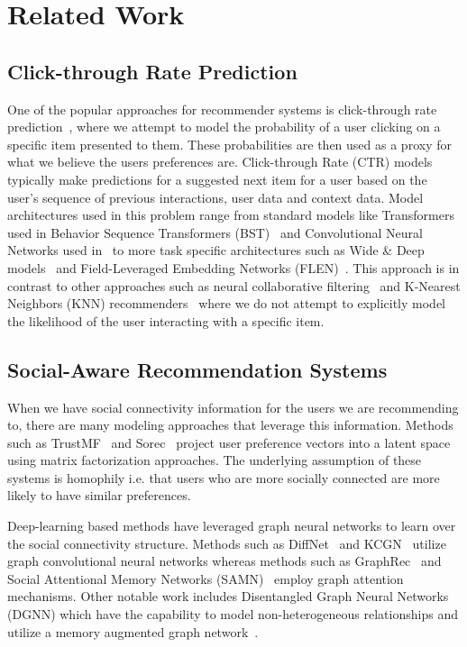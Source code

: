 \documentclass{article}
\begin{document}
\section{Related Work}
\label{sec:related}
\subsection{Click-through Rate Prediction}
One of the popular approaches for recommender systems is click-through rate prediction~\cite{zhang2021deep}, where we attempt to model the probability of a user clicking on a specific item presented to them. These probabilities are then used as a proxy for what we believe the users preferences are. Click-through Rate (CTR) models typically make predictions for a suggested next item for a user based on the user's sequence of previous interactions, user data and context data. Model architectures used in this problem range from standard models like Transformers used in Behavior Sequence Transformers (BST)~\cite{chen2019behavior} and Convolutional Neural Networks used in~\cite{liu2015convolutional} to more task specific architectures such as Wide \& Deep models~\cite{cheng2016wide} and Field-Leveraged Embedding Networks (FLEN)~\cite{chen2019flen}. This approach is in contrast to other approaches such as neural collaborative filtering~\cite{bai2017neural} and K-Nearest Neighbors (KNN) recommenders~\cite{subramaniyaswamy2017adaptive} where we do not attempt to explicitly model the likelihood of the user interacting with a specific item.


\subsection{Social-Aware Recommendation Systems}
When we have social connectivity information for the users we are recommending to, there are many modeling approaches that leverage this information. Methods such as TrustMF~\cite{yang2016social} and Sorec~\cite{ma2008sorec} project user preference vectors into a latent space using matrix factorization approaches. The underlying assumption of these systems is homophily i.e. that users who are more socially connected are more likely to have similar preferences.

Deep-learning based methods have leveraged graph neural networks to learn over the social connectivity structure. Methods such as DiffNet~\cite{wu2019neural} and KCGN~\cite{huang2021knowledge} utilize graph convolutional neural networks whereas methods such as GraphRec~\cite{fan2019graph} and Social Attentional Memory Networks (SAMN)~\cite{chen2019social} employ graph attention mechanisms. Other notable work includes Disentangled Graph Neural Networks (DGNN) which have the capability to model non-heterogeneous relationships and utilize a memory augmented graph network~\cite{xia2023disentangled}. 
\end{document}
